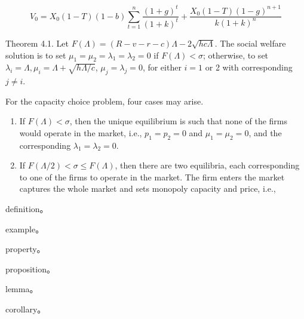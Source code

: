 \documentclass[writingLanguage=english, %
    addPageTitle=on,  %
    addDeclaration=on, %
    addMUSTlogo=on, %
    addFigTOC=on, %
    addTabTOC=on, %
    refIndent=off, %
    printMod=off, %
]{.def/must}
\begin{document}
\begin{equation}
V_0=X_0(1-T)(1-b) \sum_{t=1}^n \frac{(1+g)^t}{(1+k)^t}+\frac{X_0(1-T)(1-g)^{n+1}}{k(1+k)^n}
\end{equation}


\begin{axiom}
Theorem 4.1. Let $F(\Lambda)=(R-v-r-c) \Lambda-2 \sqrt{h c \Lambda}$. The social welfare solution is to set $\mu_1=\mu_2=\lambda_1=\lambda_2=0$ if $F(\Lambda)<\sigma$; otherwise, to set $\lambda_i=\Lambda, \mu_i=\Lambda+\sqrt{h \Lambda / c}$, $\mu_j=\lambda_j=0$, for either $i=1$ or 2 with corresponding $j \neq i$.
\end{axiom}


\begin{theorem}
For the capacity choice problem, four
cases may arise.
\begin{enumerate}[itemsep=2pt,topsep=0pt,parsep=0pt,leftmargin=*,label=\emph{(\roman*)}]
    \item If $F(\Lambda)<\sigma$, then the unique equilibrium is such that none of the firms would operate in the market, i.e., $p_1=p_2=0$ and $\mu_1=\mu_2=0$, and the corresponding $\lambda_1=\lambda_2=0$.
    \item If $F(\Lambda / 2)<\sigma \leqslant F(\Lambda)$, then there are two equilibria, each corresponding to one of the firms to operate in the market. The firm enters the market captures the whole market and sets monopoly capacity and price, i.e.,
\end{enumerate}

\end{theorem}


\begin{definition}
 definition。
\end{definition}


\begin{example}
 example。
\end{example}



\begin{property}
 property。
\end{property}

\begin{proposition}
 proposition。
\end{proposition}


\begin{lemma}
 lemma。
\end{lemma}

\begin{corollary}
 corollary。
\end{corollary}
\end{document}
